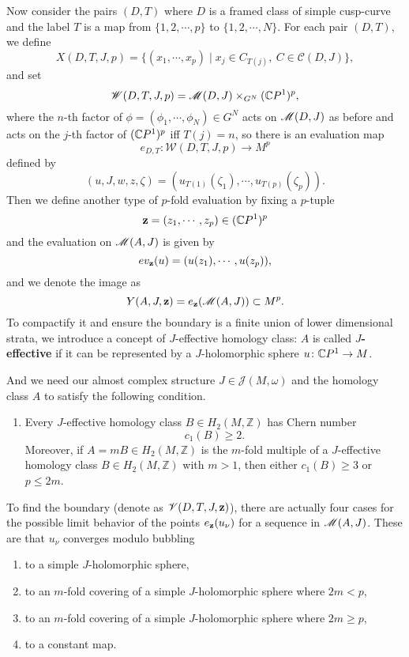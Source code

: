 \documentclass[twoside]{article}
\begin{document}
Now consider the pairs $(D,T)$ where $D$ is a framed class of 
simple cusp-curve and the label $T$ is a map from $\{1,2,\cdots,p \}$ to $\{1,2,\cdots,N \}$. 
For each pair $(D,T)$, we define 
\[X(D,T,J,p)=\{(x_1,\cdots,x_p)\mid x_j\in C_{T(j)},\ C\in\mathscr{C}(D,J)   \},\]
and set
\[\mathscr{W}(D,T,J,p)=\mathscr{M}(D,J)\times_{G^N}(\mathbb{C}P^{1})^p,\]
where the $n$-th factor of $\phi=(\phi_1,\cdots,\phi_N)\in G^N$ acts on $\mathscr{M}(D,J)$ as before 
and acts on the $j$-th factor of $(\mathbb{C}P^{1})^p$ iff $T(j)=n$, so there is an evaluation map
\[e_{D,T}\colon \mathscr{W}(D,T,J,p)\rightarrow M^p\]
defined by
\[(u,J,w,z,\zeta)=(u_{T(1)}(\zeta_1),\cdots,u_{T(p)}(\zeta_p)).\]
Then we define another type of $p$-fold evaluation by fixing a $p$-tuple 
\[\mathbf{z}=(z_1,\cdots,z_p)\in(\mathbb{C}P^{1})^p\]
and the evaluation on $\mathscr{M}(A,J)$ is given by
\[ev_{\mathbf{z}}(u)=(u(z_1),\cdots,u(z_p)),\]
and we denote the image as 
\[Y(A,J,\mathbf{z})=e_{\mathbf{z}}(\mathscr{M}(A,J))\subset M^p.\]
To compactify it and ensure the boundary is a finite union of lower dimensional strata,
we introduce a concept of $J$-effective homology class: $A$ is called \textbf{$J$-effective} 
if it can be represented by a $J$-holomorphic sphere $u\colon \mathbb{C}P^{1}\rightarrow M$.

And we need our almost complex structure $J\in\mathscr{J}(M,\omega)$ 
and the homology class $A$ to satisfy the following condition.

\begin{enumerate}[label=(\arabic*)]
    \item Every $J$-effective homology class $B\in H_2(M,\mathbb{Z})$ has Chern number
    \[c_1(B)\geq 2.\]
    Moreover, if $A=mB\in H_2(M,\mathbb{Z})$ is the $m$-fold multiple of a $J$-effective 
    homology class $B\in H_2(M,\mathbb{Z})$ with $m>1$, then either $c_1(B)\geq 3$ or $p\leq 2m$.
\end{enumerate}

To find the boundary (denote as $\mathscr{V}(D,T,J,\mathbf{z})$), 
there are actually four cases for the possible limit behavior 
of the points $e_{\mathbf{z}}(u_\nu)$ for a sequence in $\mathscr{M}(A,J)$. 
These are that $u_\nu$ converges modulo bubbling

\begin{enumerate}[label=(\alph*)]
    \item to a simple $J$-holomorphic sphere,
    \item to an $m$-fold covering of a simple $J$-holomorphic sphere where $2m<p$,
    \item to an $m$-fold covering of a simple $J$-holomorphic sphere where $2m\geq p$,
    \item to a constant map.
\end{enumerate}
\end{document}
